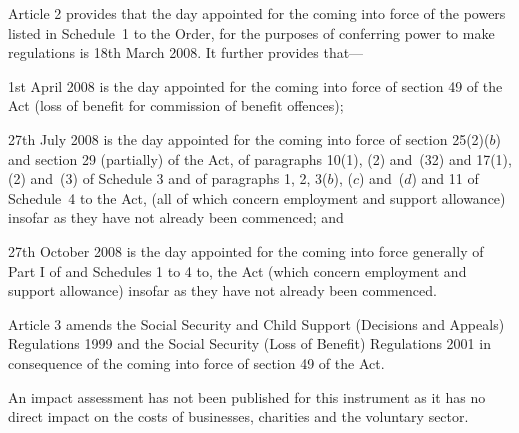 \documentclass[12pt,a4paper]{article}
\begin{document}
Article 2 provides that the day appointed for the coming into force of the powers listed in Schedule~1 to the Order, for the purposes of conferring power to make regulations is 18th March 2008. It further provides that—

    1st April 2008 is the day appointed for the coming into force of section 49 of the Act (loss of benefit for commission of benefit offences);

    27th July 2008 is the day appointed for the coming into force of section 25(2)($b$)  and section 29 (partially) of the Act, of paragraphs 10(1), (2) and~(32) and 17(1), (2) and~(3) of Schedule 3 and of paragraphs 1, 2, 3($b$), ($c$)  and~($d$)  and 11 of Schedule~4 to the Act, (all of which concern employment and support allowance) insofar as they have not already been commenced; and

    27th October 2008 is the day appointed for the coming into force generally of Part I of and Schedules 1 to 4 to, the Act (which concern employment and support allowance) insofar as they have not already been commenced. 

Article 3 amends the Social Security and Child Support (Decisions and Appeals) Regulations 1999 and the Social Security (Loss of Benefit) Regulations 2001 in consequence of the coming into force of section 49 of the Act.

An impact assessment has not been published for this instrument as it has no direct impact on the costs of businesses, charities and the voluntary sector. 
\end{document}
